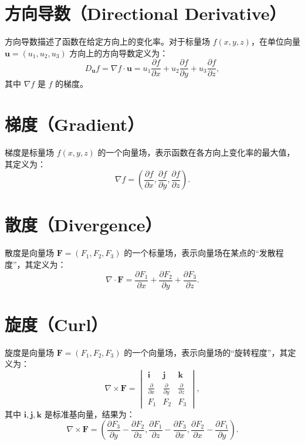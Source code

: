 \documentclass{article}
\begin{document}
\section*{方向导数（Directional Derivative）}
方向导数描述了函数在给定方向上的变化率。对于标量场 $f(x, y, z)$，在单位向量 $\mathbf{u} = (u_1, u_2, u_3)$ 方向上的方向导数定义为：
\[
D_{\mathbf{u}} f = \nabla f \cdot \mathbf{u} = u_1 \frac{\partial f}{\partial x} + u_2 \frac{\partial f}{\partial y} + u_3 \frac{\partial f}{\partial z},
\]
其中 $\nabla f$ 是 $f$ 的梯度。

\section*{梯度（Gradient）}
梯度是标量场 $f(x, y, z)$ 的一个向量场，表示函数在各方向上变化率的最大值，其定义为：
\[
\nabla f = \left( \frac{\partial f}{\partial x}, \frac{\partial f}{\partial y}, \frac{\partial f}{\partial z} \right).
\]

\section*{散度（Divergence）}
散度是向量场 $\mathbf{F} = (F_1, F_2, F_3)$ 的一个标量场，表示向量场在某点的“发散程度”，其定义为：
\[
\nabla \cdot \mathbf{F} = \frac{\partial F_1}{\partial x} + \frac{\partial F_2}{\partial y} + \frac{\partial F_3}{\partial z}.
\]

\section*{旋度（Curl）}
旋度是向量场 $\mathbf{F} = (F_1, F_2, F_3)$ 的一个向量场，表示向量场的“旋转程度”，其定义为：
\[
\nabla \times \mathbf{F} = 
\begin{vmatrix}
\mathbf{i} & \mathbf{j} & \mathbf{k} \\
\frac{\partial}{\partial x} & \frac{\partial}{\partial y} & \frac{\partial}{\partial z} \\
F_1 & F_2 & F_3
\end{vmatrix},
\]
其中 $\mathbf{i}, \mathbf{j}, \mathbf{k}$ 是标准基向量，结果为：
\[
\nabla \times \mathbf{F} = \left( 
\frac{\partial F_3}{\partial y} - \frac{\partial F_2}{\partial z}, 
\frac{\partial F_1}{\partial z} - \frac{\partial F_3}{\partial x}, 
\frac{\partial F_2}{\partial x} - \frac{\partial F_1}{\partial y}
\right).
\]
\end{document}

